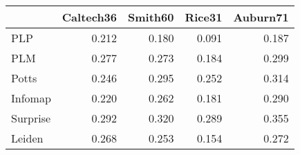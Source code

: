 \begin{tabular}{lrrrr}
\toprule
{} & Caltech36 & Smith60 & Rice31 & Auburn71 \\
\midrule
PLP      &     0.212 &   0.180 &  0.091 &    0.187 \\
PLM      &     0.277 &   0.273 &  0.184 &    0.299 \\
Potts    &     0.246 &   0.295 &  0.252 &    0.314 \\
Infomap  &     0.220 &   0.262 &  0.181 &    0.290 \\
Surprise &     0.292 &   0.320 &  0.289 &    0.355 \\
Leiden   &     0.268 &   0.253 &  0.154 &    0.272 \\
\bottomrule
\end{tabular}
